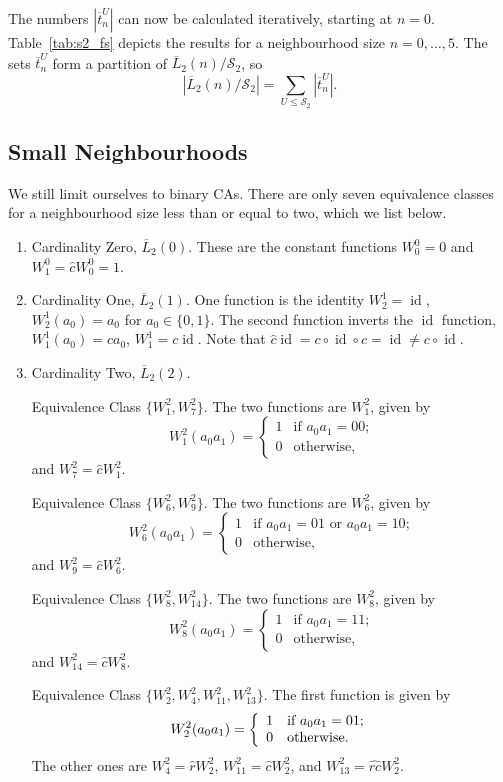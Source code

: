 \documentclass[11pt,a4paper]{article}
\newcommand{\rev}[1]{{\color{blue}#1}}
\newcommand{\rev}[1]{{\color{black}#1}}
\newcommand{\id}{\mathop{\mathrm{id}}}
\begin{document}
The numbers \rev{$|\overline{t}^U_n|$} \rev{can now be calculated iteratively, starting at $n=0$.}
Table~\ref{tab:s2_fs} depicts the results for a neighbourhood size $n=0, \ldots, 5$.
The sets $\overline{t}^U_n$ form a partition of $\overline{L}_2(n) / \mathcal{S}_2$, so
\[
|\overline{L}_2(n) / \mathcal{S}_2| = \sum_{U \le \mathcal{S}_2} |\overline{t}^U_n|.
\]


\subsection{Small Neighbourhoods}

We still limit ourselves to binary CAs.
There are only seven equivalence classes for a neighbourhood size less than or equal to two, which we
list below.

\begin{enumerate}

\item Cardinality Zero, $\overline{L}_2(0)$.
These are the constant functions $W^0_0 = 0$ and $W^0_1 = \hat{c} W^0_0 = 1$.

\item Cardinality One, $\overline{L}_2(1)$.
One function is the identity $W^1_2 = \id$, $W^1_2(a_0) = a_0$ for $a_0 \in \{0,1\}$.
The second function inverts the $\id$ function, $W^1_1(a_0) = ca_0$, $W^1_1 = c \id$.
Note that $\hat{c} \id = c \circ \id \circ c = \id \ne c \circ \id$.

\item Cardinality Two, $\overline{L}_2(2)$.

Equivalence Class $\{W^2_1, W^2_7\}$.
The two functions are $W^2_1$, given by
\[
W^2_1(a_0a_1) =
\left\{
\begin{array}{ll}
1 & \mbox{if $a_0a_1 = 00$;} \\
0 & \mbox{otherwise,}
\end{array}
\right.
\]
and $W^2_{7} = \hat{c}W^2_1$.

Equivalence Class $\{W^2_6, W^2_9\}$.
The two functions are
$W^2_6$, given by
\[
W^2_6(a_0a_1) =
\left\{
\begin{array}{ll}
1 & \mbox{if $a_0a_1 = 01$ or $a_0a_1 = 10$;} \\
0 & \mbox{otherwise,}
\end{array}
\right.
\]
and $W^2_9 = \hat{c}W^2_6$.

Equivalence Class $\{W^2_8, W^2_{14}\}$.
The two functions are
$W^2_8$, given by
\[
W^2_8(a_0a_1) =
\left\{
\begin{array}{ll}
1 & \mbox{if $a_0a_1 = 11$;} \\
0 & \mbox{otherwise,}
\end{array}
\right.
\]
and $W^2_{14} = \hat{c}W^2_8$.

Equivalence Class
$\{W^2_2,W^2_4,W^2_{11},W^2_{13}\}$.
The first function is given by
\[
W^2_2(a_0a_1) =
\left\{
\begin{array}{ll}
1 & \mbox{if $a_0a_1 = 01$;} \\
0 & \mbox{otherwise\rev{.}}
\end{array}
\right.
\]
The other ones are $W^2_4 = \hat{r}W^2_2$, $W^2_{11} = \hat{c}W^2_2$, and
$W^2_{13} = \widehat{rc} W^2_2$.


\end{enumerate}
\end{document}
